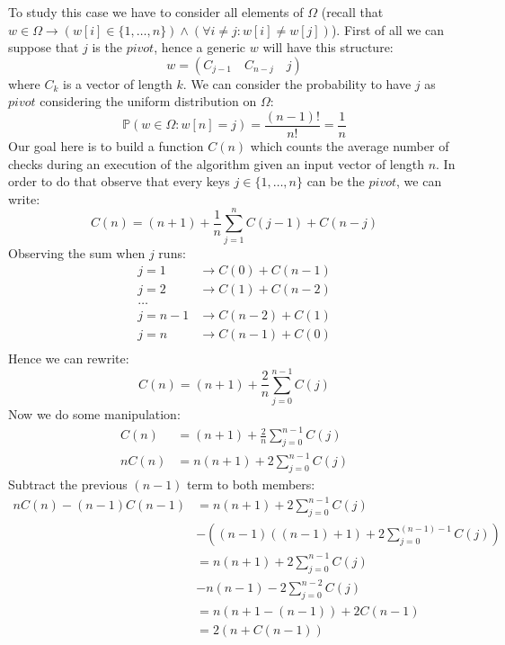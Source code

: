 To study this case we have to consider all
elements of $\Omega$ (recall that $w \in \Omega \rightarrow (w[i]\in
\{1,\ldots,n\}) \wedge (\forall i\not =j: w[i]\not=w[j])$). First of
all we can suppose that $j$ is the $pivot$, hence a generic $w$ will
have this structure:
\begin{displaymath}
  w = (C_{j-1} \quad C_{n-j} \quad j)
\end{displaymath}
where $C_k$ is a vector of length $k$. We can consider the
probability to have $j$ as $pivot$ considering the uniform
distribution on $\Omega$:
\begin{displaymath}
  \mathbb{P}\left(w\in\Omega: w[n]=j \right) =
  \frac{(n-1)!}{n!} =  \frac{1}{n} 
\end{displaymath}
Our goal here is to build a function $C(n)$ which counts the average
number of checks during an execution of the algorithm given an input
vector of length $n$. In order to do that observe that every keys $j
\in \{1,\ldots,n\}$ can be the $pivot$, we can write:
\begin{displaymath}
  C(n) = (n+1) +  \frac{1}{n}\sum_{j=1}^{n}{C(j-1) + C(n-j)} 
\end{displaymath}
Observing the sum when $j$ runs:
\begin{displaymath}
  \begin{split}
    j=1 &\rightarrow C(0) + C(n-1) \\
    j=2 &\rightarrow C(1) + C(n-2) \\
    \ldots& \\
    j=n-1 &\rightarrow C(n-2) + C(1) \\
    j=n &\rightarrow C(n-1) + C(0) \\
  \end{split}
\end{displaymath}
Hence we can rewrite:
\begin{displaymath}
  C(n) = (n+1) +  \frac{2}{n}\sum_{j=0}^{n-1}{C(j)} 
\end{displaymath}
Now we do some manipulation:
\begin{displaymath}
  \begin{split}
    C(n) &= (n+1) + \frac{2}{n}\sum_{j=0}^{n-1}{C(j)}\\
    nC(n) &= n(n+1) + 2\sum_{j=0}^{n-1}{C(j)}
  \end{split}
\end{displaymath}
Subtract the previous $(n-1)$ term to both members:
\begin{displaymath}
  \begin{split}
    nC(n) -(n-1)C(n-1) &= n(n+1) + 2\sum_{j=0}^{n-1}{C(j)} \\
    &-\left((n-1)((n-1)+1) + 2\sum_{j=0}^{(n-1)-1}{C(j)}\right) \\
    &= n(n+1) + 2\sum_{j=0}^{n-1}{C(j)} \\
    &-n(n-1) - 2\sum_{j=0}^{n-2}{C(j)} \\
    &= n(n+1-(n-1)) + 2C(n-1) \\
    &= 2(n + C(n-1)) \\      
  \end{split}
\end{displaymath}
